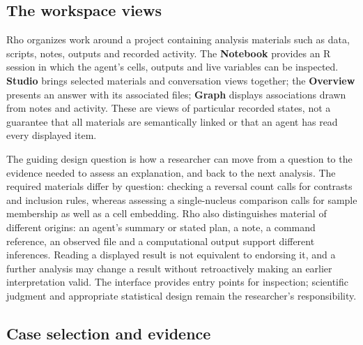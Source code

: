 \documentclass[11pt]{article}
\begin{document}
\subsection{The workspace views}\label{views}

Rho organizes work around a project containing analysis materials such as data, scripts, notes, outputs and recorded activity. The \textbf{Notebook} provides an R session in which the agent's cells, outputs and live variables can be inspected. \textbf{Studio} brings selected materials and conversation views together; the \textbf{Overview} presents an answer with its associated files; \textbf{Graph} displays associations drawn from notes and activity. These are views of particular recorded states, not a guarantee that all materials are semantically linked or that an agent has read every displayed item.

The guiding design question is how a researcher can move from a question to the evidence needed to assess an explanation, and back to the next analysis. The required materials differ by question: checking a reversal count calls for contrasts and inclusion rules, whereas assessing a single-nucleus comparison calls for sample membership as well as a cell embedding. Rho also distinguishes material of different origins: an agent's summary or stated plan, a note, a command reference, an observed file and a computational output support different inferences. Reading a displayed result is not equivalent to endorsing it, and a further analysis may change a result without retroactively making an earlier interpretation valid. The interface provides entry points for inspection; scientific judgment and appropriate statistical design remain the researcher's responsibility.

\subsection{Case selection and evidence}\label{cases}
\end{document}
